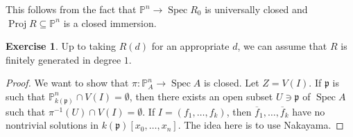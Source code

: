 \documentclass[leqno, openany]{memoir}
\theoremstyle{definition}
\newtheorem{exer}[thm]{Exercise}
\theoremstyle{remark}
\theoremstyle{plain}
\theoremstyle{definition}
\theoremstyle{remark}
\renewcommand{\P}{\mathbb{P}}
\newcommand{\mf}[1]{\mathfrak{#1}}
\newcommand{\ol}[1]{\overline{#1}}
\DeclareMathOperator{\Spec}{Spec}
\DeclareMathOperator{\Proj}{Proj}
\begin{document}
This follows from the fact that $\P^n \to \Spec R_0$ is universally closed and $\Proj R \subseteq \P^n$ is a closed immersion.

\begin{exer}
    Up to taking $R(d)$ for an appropriate $d$, we can assume that $R$ is finitely generated in degree $1$.
\end{exer}

\begin{proof}
    We want to show that $\pi \colon \P^n_A \to \Spec A$ is closed. Let $Z = V(I)$. If $\mf{p}$ is such that $\P^n_{k(\mf{p})} \cap V(I) = \emptyset$, then there exists an open subset $U \ni \mf{p}$ of $\Spec A$ such that $\pi^{-1}(U) \cap V(I) = \emptyset$. If $I = (f_1, \ldots, f_k)$, then $\ol{f}_1, \ldots, \ol{f}_k$ have no nontrivial solutions in $k(\mf{p})[x_0, \ldots, x_n]$. The idea here is to use Nakayama.
\end{proof}
\end{document}
